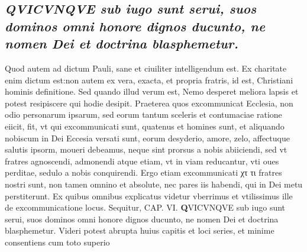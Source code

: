 \documentclass{article}
\begin{document}
\begin{pages}
\subsection*{\textit{QVICVNQVE sub iugo sunt serui, suos dominos omni honore dignos ducunto, ne nomen Dei et doctrina blasphemetur.}}Quod autem ad dictum Pauli, sane et ciuiliter intelligendum est. Ex charitate enim dictum est:non autem ex vera, exacta, et propria fratris, id est, Christiani hominis definitione. Sed quando illud verum est, Nemo desperet meliora lapsis et potest resipiscere qui hodie desipit. Praeterea quos excommunicat Ecclesia, non odio personarum ipsarum, sed eorum tantum sceleris et contumaciae ratione eiicit, fit, vt qui excommunicati sunt, quatenus et homines sunt, et aliquando nobiscum in Dei Eccesia versati sunt, eorum desyderio, amore, zelo, affectuque salutis ipsorm, moueri debeamus, neque sint prorsus a nobis abiiciendi, sed vt fratres agnoscendi, admonendi atque etiam, vt in viam reducantur, vti oues perditae, sedulo a nobis conquirendi. Ergo etiam excommunicati χτ τι fratres nostri sunt, non tamen omnino et absolute, nec pares iis habendi, qui in Dei metu perstiterunt. Ex quibus omnibus explicatus videtur vberrimus et vtilissimus ille de excommunicatione locus. Sequitur, CAP. VI. 
\textbf{Q}VICVNQVE sub iugo sunt serui, suos dominos omni honore dignos ducunto, ne nomen Dei et doctrina blasphemetur. Videri potest abrupta huius capitis et loci series, et minime consentiens cum toto superio\pend
\endnumbering
\end{pages}
\end{document}
